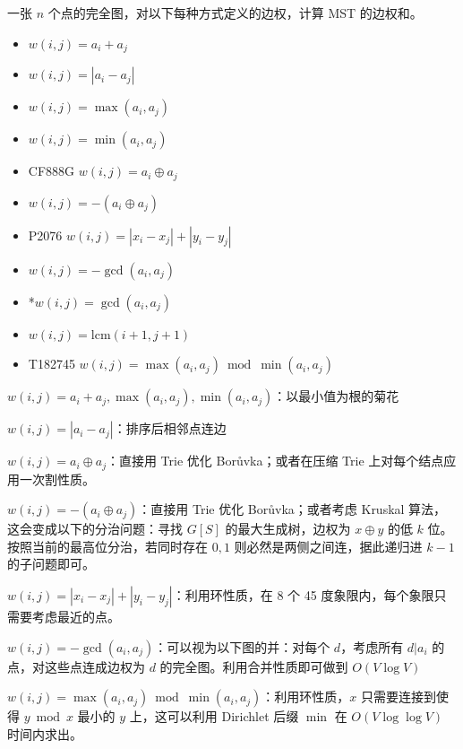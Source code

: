 \begin{example}
    一张 $n$ 个点的完全图，对以下每种方式定义的边权，计算 MST 的边权和。
    \begin{itemize}
        \item $w(i,j)=a_i+a_j$
        \item $w(i,j)=|a_i-a_j|$
        \item $w(i,j)=\max(a_i,a_j)$
        \item $w(i,j)=\min(a_i,a_j)$
        \item CF888G $w(i,j)=a_i\oplus a_j$
        \item $w(i,j)=-(a_i\oplus a_j)$
        \item P2076 $w(i,j)=|x_i-x_j|+|y_i-y_j|$
        \item $w(i,j)=-\gcd(a_i,a_j)$
        \item *$w(i,j)=\gcd(a_i,a_j)$
        \item $w(i,j)=\mathrm{lcm}(i+1,j+1)$
        \item T182745 $w(i,j)=\max(a_i,a_j)\bmod \min(a_i,a_j)$
    \end{itemize}
\end{example}
\begin{solution}
    $w(i,j)=a_i+a_j,\max(a_i,a_j),\min(a_i,a_j)$：以最小值为根的菊花

    $w(i,j)=|a_i-a_j|$：排序后相邻点连边

    $w(i,j)=a_i\oplus a_j$：直接用 Trie 优化 Borůvka；或者在压缩 Trie 上对每个结点应用一次割性质。

    $w(i,j)=-(a_i\oplus a_j)$：直接用 Trie 优化 Borůvka；或者考虑 Kruskal 算法，这会变成以下的分治问题：寻找 $G[S]$ 的最大生成树，边权为 $x\oplus y$ 的低 $k$ 位。按照当前的最高位分治，若同时存在 $0,1$ 则必然是两侧之间连，据此递归进 $k-1$ 的子问题即可。

    $w(i,j)=|x_i-x_j|+|y_i-y_j|$：利用环性质，在 8 个 45 度象限内，每个象限只需要考虑最近的点。

    $w(i,j)=-\gcd(a_i,a_j)$：可以视为以下图的并：对每个 $d$，考虑所有 $d|a_i$ 的点，对这些点连成边权为 $d$ 的完全图。利用合并性质即可做到 $O(V\log V)$


    $w(i,j)=\max(a_i,a_j)\bmod \min(a_i,a_j)$：利用环性质，$x$ 只需要连接到使得 $y\bmod x$ 最小的 $y$ 上，这可以利用 Dirichlet 后缀 $\min$ 在 $O(V\log\log V)$ 时间内求出。
\end{solution}


